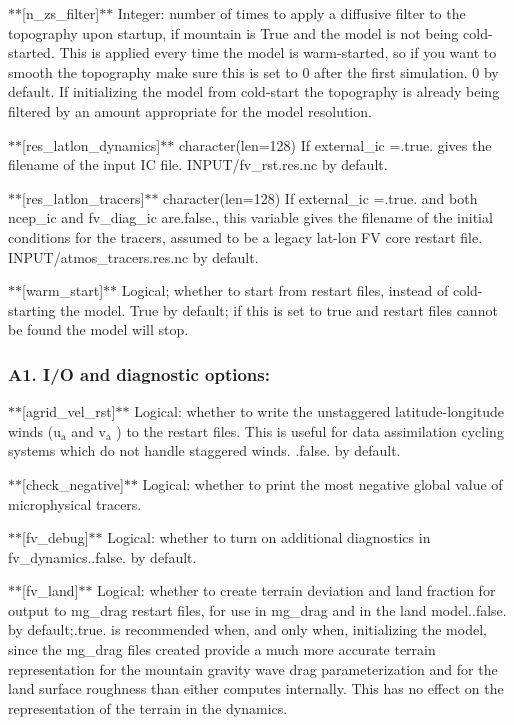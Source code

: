 $\ast$$\ast$\mbox{[}n\-\_\-zs\-\_\-filter\mbox{]}$\ast$$\ast$ Integer\-: number of times to apply a diffusive filter to the topography upon startup, if mountain is True and the model is not being cold-\/started. This is applied every time the model is warm-\/started, so if you want to smooth the topography make sure this is set to 0 after the first simulation. 0 by default. If initializing the model from cold-\/start the topography is already being filtered by an amount appropriate for the model resolution.

$\ast$$\ast$\mbox{[}res\-\_\-latlon\-\_\-dynamics\mbox{]}$\ast$$\ast$ character(len=128) If external\-\_\-ic =.true. gives the filename of the input I\-C file. I\-N\-P\-U\-T/fv\-\_\-rst.\-res.\-nc by default.

$\ast$$\ast$\mbox{[}res\-\_\-latlon\-\_\-tracers\mbox{]}$\ast$$\ast$ character(len=128) If external\-\_\-ic =.true. and both ncep\-\_\-ic and fv\-\_\-diag\-\_\-ic are.\-false., this variable gives the filename of the initial conditions for the tracers, assumed to be a legacy lat-\/lon F\-V core restart file. I\-N\-P\-U\-T/atmos\-\_\-tracers.\-res.\-nc by default.

$\ast$$\ast$\mbox{[}warm\-\_\-start\mbox{]}$\ast$$\ast$ Logical; whether to start from restart files, instead of cold-\/starting the model. True by default; if this is set to true and restart files cannot be found the model will stop.

\subsubsection*{A1. I/\-O and diagnostic options\-:}

$\ast$$\ast$\mbox{[}agrid\-\_\-vel\-\_\-rst\mbox{]}$\ast$$\ast$ Logical\-: whether to write the unstaggered latitude-\/longitude winds (u$_{\mbox{a}}$  and v$_{\mbox{a}}$ ) to the restart files. This is useful for data assimilation cycling systems which do not handle staggered winds. .false. by default.

$\ast$$\ast$\mbox{[}check\-\_\-negative\mbox{]}$\ast$$\ast$ Logical\-: whether to print the most negative global value of microphysical tracers.

$\ast$$\ast$\mbox{[}fv\-\_\-debug\mbox{]}$\ast$$\ast$ Logical\-: whether to turn on additional diagnostics in fv\-\_\-dynamics..false. by default.

$\ast$$\ast$\mbox{[}fv\-\_\-land\mbox{]}$\ast$$\ast$ Logical\-: whether to create terrain deviation and land fraction for output to mg\-\_\-drag restart files, for use in mg\-\_\-drag and in the land model..false. by default;.true. is recommended when, and only when, initializing the model, since the mg\-\_\-drag files created provide a much more accurate terrain representation for the mountain gravity wave drag parameterization and for the land surface roughness than either computes internally. This has no effect on the representation of the terrain in the dynamics.

